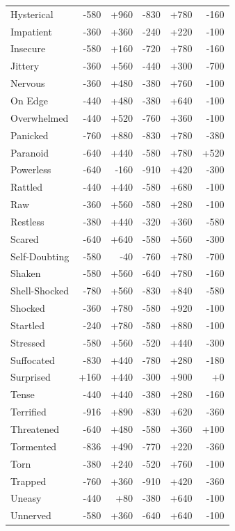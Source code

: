 \begin{longtable}{@{}p{}rrrrr@{}}
Hysterical & -580 & +960 & -830 & +780 & -160 \\
Impatient & -360 & +360 & -240 & +220 & -100 \\
Insecure & -580 & +160 & -720 & +780 & -160 \\
Jittery & -360 & +560 & -440 & +300 & -700 \\
Nervous & -360 & +480 & -380 & +760 & -100 \\
On Edge & -440 & +480 & -380 & +640 & -100 \\
Overwhelmed & -440 & +520 & -760 & +360 & -100 \\
Panicked & -760 & +880 & -830 & +780 & -380 \\
Paranoid & -640 & +440 & -580 & +780 & +520 \\
Powerless & -640 & -160 & -910 & +420 & -300 \\
Rattled & -440 & +440 & -580 & +680 & -100 \\
Raw & -360 & +560 & -580 & +280 & -100 \\
Restless & -380 & +440 & -320 & +360 & -580 \\
Scared & -640 & +640 & -580 & +560 & -300 \\
Self-Doubting & -580 & -40 & -760 & +780 & -700 \\
Shaken & -580 & +560 & -640 & +780 & -160 \\
Shell-Shocked & -780 & +560 & -830 & +840 & -580 \\
Shocked & -360 & +780 & -580 & +920 & -100 \\
Startled & -240 & +780 & -580 & +880 & -100 \\
Stressed & -580 & +560 & -520 & +440 & -300 \\
Suffocated & -830 & +440 & -780 & +280 & -180 \\
Surprised & +160 & +440 & -300 & +900 & +0 \\
Tense & -440 & +440 & -380 & +280 & -160 \\
Terrified & -916 & +890 & -830 & +620 & -360 \\
Threatened & -640 & +480 & -580 & +360 & +100 \\
Tormented & -836 & +490 & -770 & +220 & -360 \\
Torn & -380 & +240 & -520 & +760 & -100 \\
Trapped & -760 & +360 & -910 & +420 & -360 \\
Uneasy & -440 & +80 & -380 & +640 & -100 \\
Unnerved & -580 & +360 & -640 & +640 & -100 \\

\end{longtable}
